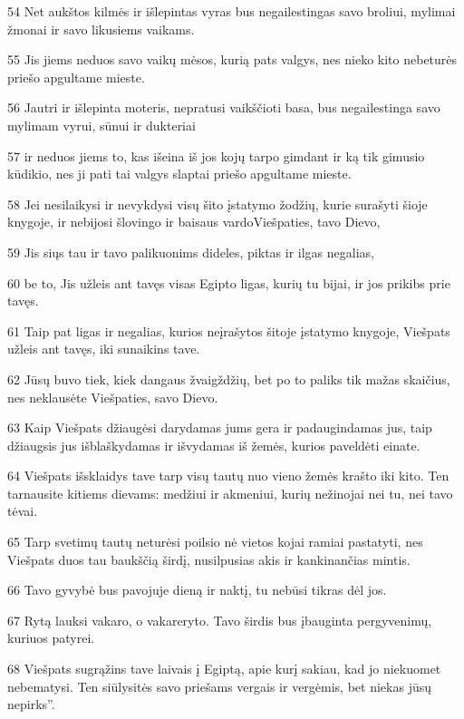\par 54 Net aukštos kilmės ir išlepintas vyras bus negailestingas savo broliui, mylimai žmonai ir savo likusiems vaikams. 
\par 55 Jis jiems neduos savo vaikų mėsos, kurią pats valgys, nes nieko kito nebeturės priešo apgultame mieste. 
\par 56 Jautri ir išlepinta moteris, nepratusi vaikščioti basa, bus negailestinga savo mylimam vyrui, sūnui ir dukteriai 
\par 57 ir neduos jiems to, kas išeina iš jos kojų tarpo gimdant ir ką tik gimusio kūdikio, nes ji pati tai valgys slaptai priešo apgultame mieste. 
\par 58 Jei nesilaikysi ir nevykdysi visų šito įstatymo žodžių, kurie surašyti šioje knygoje, ir nebijosi šlovingo ir baisaus vardo­Viešpaties, tavo Dievo, 
\par 59 Jis siųs tau ir tavo palikuonims dideles, piktas ir ilgas negalias, 
\par 60 be to, Jis užleis ant tavęs visas Egipto ligas, kurių tu bijai, ir jos prikibs prie tavęs. 
\par 61 Taip pat ligas ir negalias, kurios neįrašytos šitoje įstatymo knygoje, Viešpats užleis ant tavęs, iki sunaikins tave. 
\par 62 Jūsų buvo tiek, kiek dangaus žvaigždžių, bet po to paliks tik mažas skaičius, nes neklausėte Viešpaties, savo Dievo. 
\par 63 Kaip Viešpats džiaugėsi darydamas jums gera ir padaugindamas jus, taip džiaugsis jus išblaškydamas ir išvydamas iš žemės, kurios paveldėti einate. 
\par 64 Viešpats išsklaidys tave tarp visų tautų nuo vieno žemės krašto iki kito. Ten tarnausite kitiems dievams: medžiui ir akmeniui, kurių nežinojai nei tu, nei tavo tėvai. 
\par 65 Tarp svetimų tautų neturėsi poilsio nė vietos kojai ramiai pastatyti, nes Viešpats duos tau baukščią širdį, nusilpusias akis ir kankinančias mintis. 
\par 66 Tavo gyvybė bus pavojuje dieną ir naktį, tu nebūsi tikras dėl jos. 
\par 67 Rytą lauksi vakaro, o vakare­ryto. Tavo širdis bus įbauginta pergyvenimų, kuriuos patyrei. 
\par 68 Viešpats sugrąžins tave laivais į Egiptą, apie kurį sakiau, kad jo niekuomet nebematysi. Ten siūlysitės savo priešams vergais ir vergėmis, bet niekas jūsų nepirks”.



